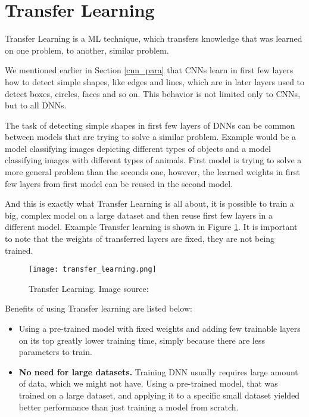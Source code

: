 \section{ Transfer Learning}\label{transfer_para}

Transfer Learning is a ML technique, which transfers knowledge that was learned on one problem, to another, similar problem.

We mentioned earlier in Section \ref{cnn_para} that CNNs learn in first few layers how to detect simple shapes, like edges and lines, which are in later layers used to detect boxes, circles, faces and so on. 
This behavior is not limited only to CNNs, but to all DNNs.

The task of detecting simple shapes in first few layers of DNNs can be common between models that are trying to solve a similar problem.
Example would be a model classifying images depicting different types of objects and a model classifying images with different types of animals.
First model is trying to solve a more general problem than the seconds one, however, the learned weights in first few layers from first model can be reused in the second model.

And this is exactly what Transfer Learning is all about, it is possible to train a big, complex model on a large dataset and then reuse first few layers in a different model.
Example Transfer learning is shown in Figure \ref{transfer_learning}.
It is important to note that the weights of transferred layers are fixed, they are not being trained.

\begin{figure}[ht] 
    \centering
    \texttt{[image: transfer\_learning.png]} 
    \caption[Transfer Learning.] {Transfer Learning. Image source: \cite{geron}}
    \label{transfer_learning}
\end{figure}

Benefits of using Transfer learning are listed below:

\begin{itemize}
    \item {} Using a pre-trained model with fixed weights and adding few trainable layers on its top greatly lower training time, simply because there are less parameters to train.
    \item \textbf{No need for large datasets.} Training DNN usually requires large amount of data, which we might not have. Using a pre-trained model, that was trained on a large dataset, and applying it to a specific small dataset yielded better performance than just training a model from scratch\cite{geron}.
\end{itemize}


